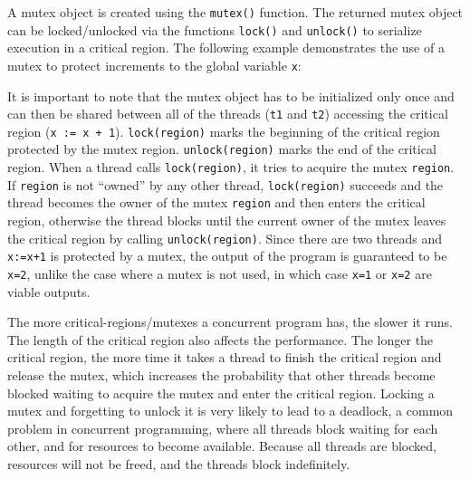 A mutex object is created using the \texttt{mutex()}
function. The returned mutex object can be locked/unlocked via the
functions \texttt{lock()} and \texttt{unlock()}
to serialize execution in a critical region. The following example
demonstrates the use of a mutex to protect increments to the global
variable \texttt{x}:


It is important to note that the mutex object has to be initialized only
once and can then be shared between all of the threads
(\texttt{t1} and \texttt{t2}) accessing
the critical region (\texttt{x := x + 1}).
\texttt{lock(region)} marks the beginning of the
critical region protected by the mutex region.
\texttt{unlock(region)} marks the end of the critical
region. When a thread calls \texttt{lock(region)}, it
tries to acquire the mutex \texttt{region}. If
\texttt{region} is not
{\textquotedblleft}owned{\textquotedblright} by any other thread,
\texttt{lock(region)} succeeds and the thread becomes
the owner of the mutex \texttt{region} and then enters
the critical region, otherwise the thread blocks until the current
owner of the mutex leaves the critical region by calling
\texttt{unlock(region)}. Since there are two threads
and \texttt{x:=x+1} is protected by a mutex, the output of
the program is guaranteed to be \texttt{x=2}, unlike the
case where a mutex is not used, in which case \texttt{x=1}
or \texttt{x=2} are viable outputs.

The more critical-regions/mutexes a concurrent program has, the slower
it runs. The length of the critical region also affects the
performance. The longer the critical region, the more time it takes a
thread to finish the critical region and release the mutex, which
increases the probability that other threads become blocked waiting to
acquire the mutex and enter the critical region. Locking a mutex and
forgetting to unlock it is very likely to lead to a deadlock, a common
problem in concurrent programming, where all threads block waiting for
each other, and for resources to become available. Because all threads
are blocked, resources will not be freed, and the threads block
indefinitely. 


